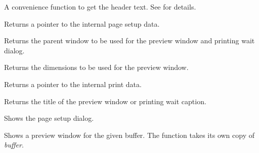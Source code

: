 A convenience function to get the header text. See  for details.

\label{wxrichtextprintinggetpagesetupdata}


Returns a pointer to the internal page setup data.

\label{wxrichtextprintinggetparentwindow}


Returns the parent window to be used for the preview window and printing wait dialog.

\label{wxrichtextprintinggetpreviewrect}


Returns the dimensions to be used for the preview window.

\label{wxrichtextprintinggetprintdata}


Returns a pointer to the internal print data.

\label{wxrichtextprintinggettitle}


Returns the title of the preview window or printing wait caption.

\label{wxrichtextprintingpagesetup}


Shows the page setup dialog.

\label{wxrichtextprintingpreviewbuffer}


Shows a preview window for the given buffer. The function takes its own copy of {\it buffer}.

\label{wxrichtextprintingpreviewfile}



